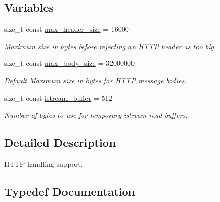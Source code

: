 \subsection*{Variables}
\begin{DoxyCompactItemize}
\item 
size\+\_\+t const \hyperlink{namespacewebsocketpp_1_1http_a514b8c48c36a9e42964f9ea35a82bc95}{max\+\_\+header\+\_\+size} = 16000\hypertarget{namespacewebsocketpp_1_1http_a514b8c48c36a9e42964f9ea35a82bc95}{}\label{namespacewebsocketpp_1_1http_a514b8c48c36a9e42964f9ea35a82bc95}

\begin{DoxyCompactList}\small\item\em Maximum size in bytes before rejecting an H\+T\+TP header as too big. \end{DoxyCompactList}\item 
size\+\_\+t const \hyperlink{namespacewebsocketpp_1_1http_a0cc54432842e22de04c4985cba23f54f}{max\+\_\+body\+\_\+size} = 32000000\hypertarget{namespacewebsocketpp_1_1http_a0cc54432842e22de04c4985cba23f54f}{}\label{namespacewebsocketpp_1_1http_a0cc54432842e22de04c4985cba23f54f}

\begin{DoxyCompactList}\small\item\em Default Maximum size in bytes for H\+T\+TP message bodies. \end{DoxyCompactList}\item 
size\+\_\+t const \hyperlink{namespacewebsocketpp_1_1http_a3632e5504bc2aeaa6b82d1cbffc2ec10}{istream\+\_\+buffer} = 512\hypertarget{namespacewebsocketpp_1_1http_a3632e5504bc2aeaa6b82d1cbffc2ec10}{}\label{namespacewebsocketpp_1_1http_a3632e5504bc2aeaa6b82d1cbffc2ec10}

\begin{DoxyCompactList}\small\item\em Number of bytes to use for temporary istream read buffers. \end{DoxyCompactList}\end{DoxyCompactItemize}


\subsection{Detailed Description}
H\+T\+TP handling support. 

\subsection{Typedef Documentation}
